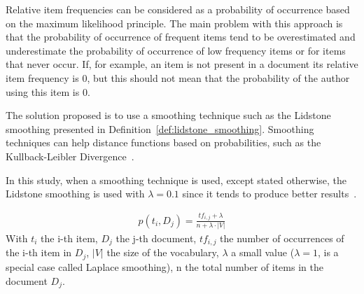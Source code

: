 Relative item frequencies can be considered as a probability of occurrence based on the maximum likelihood principle.
The main problem with this approach is that the probability of occurrence of frequent items tend to be overestimated and underestimate the probability of occurrence of low frequency items or for items that never occur.
If, for example, an item is not present in a document its relative item frequency is 0, but this should not mean that the probability of the author using this item is 0.

The solution proposed is to use a smoothing technique such as the Lidstone smoothing presented in Definition~\ref{def:lidstone_smoothing}.
Smoothing techniques can help distance functions based on probabilities, such as the Kullback-Leibler Divergence~\cite{savoy_stylo}.

In this study, when a smoothing technique is used, except stated otherwise, the Lidstone smoothing is used with $\lambda = 0.1$ since it tends to produce better results~\cite{savoy_stylo}.

\begin{definition}
  \label{def:lidstone_smoothing}
  \begin{gather*}
    p(t_i, D_j) = \frac{tf_{i,j} + \lambda}{n + \lambda \cdot |V|}
  \end{gather*}
  With $t_i$ the i-th item, $D_j$ the j-th document, $tf_{i,j}$ the number of occurrences of the i-th item in $D_j$, $|V|$ the size of the vocabulary, $\lambda$ a small value ($\lambda = 1$, is a special case called Laplace smoothing), n the total number of items in the document $D_j$.
\end{definition}
